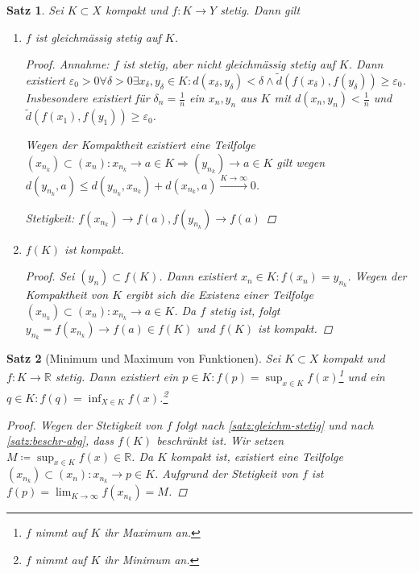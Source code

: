 \documentclass[ngerman,titlepage,twoside, parskip=half*]{scrreprt}
\newcommand*{\R}{\mathbb{R}}
\theoremstyle{break}
\newtheorem{theorem}{Satz}[section]
\theoremstyle{nonumberbreak}
\newtheorem{proof}{Beweis:}
\begin{document}
\begin{theorem}\label{satz:gleichm-stetig}
  Sei $K\subset X$ kompakt und $f\colon K\rightarrow Y$ stetig. Dann gilt
  \begin{enumerate}[(1)]
  \item $f$ ist gleichmässig stetig auf $K$.
    \begin{proof}
      Annahme: $f$ ist stetig, aber nicht gleichmässig stetig auf
      $K$. Dann existiert $\varepsilon_0>0 \forall \delta >0 \exists
      x_{\delta},y_{\delta}\in K\colon d(x_{\delta},
      y_{\delta})<\delta\wedge\tilde{d}(f(x_{\delta}),f(y_{\delta}))\geq
      \varepsilon_0$. Insbesondere existiert für
      $\delta_n=\frac{1}{n}$ ein $x_n,y_n$ aus $K$ mit
      $d(x_n,y_n)<\frac{1}{n}$ und $\tilde{d}(f(x_1),f(y_1))\geq
      \varepsilon_0$.

      Wegen der Kompaktheit existiert eine Teilfolge $(x_{n_k})\subset
      (x_n)\colon x_{n_k}\rightarrow a\in K \Rightarrow
      (y_{n_k})\rightarrow a\in K$ gilt wegen $d(y_{n_k},a)\leq
      d(y_{n_k},x_{n_k})+d(x_{n_k},a)\xrightarrow{K\rightarrow\infty}0$.

      Stetigkeit: $f(x_{n_k})\rightarrow f(a), f(y_{n_k})\rightarrow
      f(a)$\lightning
    \end{proof}
  \item $f(K)$  ist kompakt.
    \begin{proof}
      Sei $(y_n)\subset f(K)$. Dann existiert $x_n \in K\colon
      f(x_n)=y_{n_k}$. Wegen der Kompaktheit von $K$ ergibt sich die
      Existenz einer Teilfolge $(x_{n_k})\subset (x_n)\colon x_{n_k}\rightarrow
    a \in K$. Da $f$ stetig ist, folgt $y_{n_k}=f(x_{n_k})\rightarrow
    f(a) \in f(K)$ und $f(K)$ ist kompakt.
    \end{proof}    
\end{enumerate}
\end{theorem}

\begin{theorem}[Minimum und Maximum von Funktionen]\label{satz:max-fkt}
  Sei $K\subset X$ kompakt und $f\colon K\rightarrow\R$ stetig. Dann
  existiert ein $p \in K\colon f(p)=\sup_{x\in K}f(x)$\footnote{$f$
    nimmt auf $K$ ihr Maximum an.} und ein $q \in K\colon
  f(q)=\inf_{X\in K}f(x)$.\footnote{$f$ nimmt auf $K$ ihr Minimum an.}
  \begin{proof}
    Wegen der Stetigkeit von $f$ folgt nach
    \autoref{satz:gleichm-stetig} und nach \ref{satz:beschr-abg}, dass
    $f(K)$ beschränkt ist. Wir setzen $M\coloneqq\sup_{x\in K}
    f(x)\in\R$. Da $K$ kompakt ist, existiert eine Teilfolge
    $(x_{n_k})\subset (x_n)\colon x_{n_k}\rightarrow p\in K$. Aufgrund
    der Stetigkeit von $f$ ist  $f(p)=\lim_{K\rightarrow \infty}
    f(x_{n_{k}})=M$.
  \end{proof}
\end{theorem}
\end{document}
